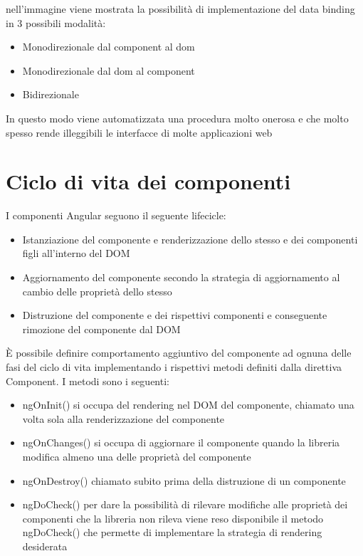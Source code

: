 nell'immagine viene mostrata la possibilità di implementazione del data binding in 3 possibili modalità:
\begin{itemize}
    \item Monodirezionale dal component al dom
    \item Monodirezionale dal dom al component
    \item Bidirezionale
\end{itemize}
In questo modo viene automatizzata una procedura molto onerosa e che molto spesso rende illeggibili le interfacce di molte applicazioni web%
\section{Ciclo di vita dei componenti}
I componenti Angular seguono il seguente lifecicle:

\begin{itemize}
    \item Istanziazione del componente e renderizzazione dello stesso e dei componenti figli all'interno del DOM
    \item Aggiornamento del componente secondo la strategia di aggiornamento al cambio delle proprietà dello stesso
    \item Distruzione del componente e dei rispettivi componenti e conseguente rimozione del componente dal DOM
\end{itemize}

È possibile definire comportamento aggiuntivo del componente ad ognuna delle fasi del ciclo di vita implementando i rispettivi metodi definiti dalla direttiva Component.
I metodi sono i seguenti:

\begin{itemize}
    \item ngOnInit() si occupa del rendering nel DOM del componente, chiamato una volta sola alla renderizzazione  del componente
    \item ngOnChanges() si occupa di aggiornare il componente quando la libreria modifica almeno una delle proprietà del componente
    \item ngOnDestroy() chiamato subito prima della distruzione di un componente
    \item ngDoCheck() per dare la possibilità di rilevare modifiche alle proprietà dei componenti che la libreria non rileva viene reso disponibile il metodo ngDoCheck() che permette di implementare la strategia di rendering desiderata
\end{itemize}

